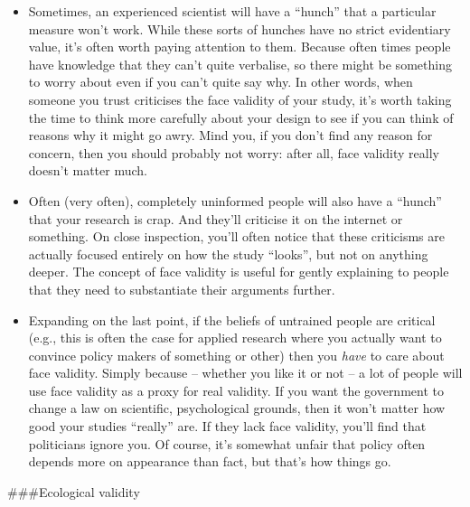 \documentclass[]{book}
\providecommand{\tightlist}{%
  \setlength{\itemsep}{0pt}\setlength{\parskip}{0pt}}
\begin{document}
\begin{itemize}
\tightlist
\item
  Sometimes, an experienced scientist will have a ``hunch'' that a particular measure won't work. While these sorts of hunches have no strict evidentiary value, it's often worth paying attention to them. Because often times people have knowledge that they can't quite verbalise, so there might be something to worry about even if you can't quite say why. In other words, when someone you trust criticises the face validity of your study, it's worth taking the time to think more carefully about your design to see if you can think of reasons why it might go awry. Mind you, if you don't find any reason for concern, then you should probably not worry: after all, face validity really doesn't matter much.
\item
  Often (very often), completely uninformed people will also have a ``hunch'' that your research is crap. And they'll criticise it on the internet or something. On close inspection, you'll often notice that these criticisms are actually focused entirely on how the study ``looks'', but not on anything deeper. The concept of face validity is useful for gently explaining to people that they need to substantiate their arguments further.
\item
  Expanding on the last point, if the beliefs of untrained people are critical (e.g., this is often the case for applied research where you actually want to convince policy makers of something or other) then you \emph{have} to care about face validity. Simply because -- whether you like it or not -- a lot of people will use face validity as a proxy for real validity. If you want the government to change a law on scientific, psychological grounds, then it won't matter how good your studies ``really'' are. If they lack face validity, you'll find that politicians ignore you. Of course, it's somewhat unfair that policy often depends more on appearance than fact, but that's how things go.
\end{itemize}

\#\#\#Ecological validity
\end{document}
